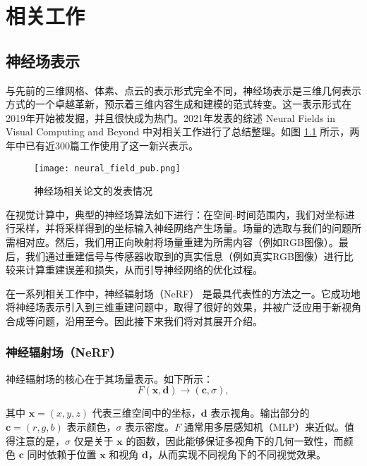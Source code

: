 \chapter{相关工作}

\section{神经场表示}

与先前的三维网格、体素、点云的表示形式完全不同，神经场表示是三维几何表示方式的一个卓越革新，预示着三维内容生成和建模的范式转变。这一表示形式在2019年开始被发掘，并且很快成为热门。2021年发表的综述 Neural Fields in Visual Computing and Beyond \cite{neural_field_summary} 中对相关工作进行了总结整理。如图 \ref{fig:neural_field_pub} 所示，两年中已有近300篇工作使用了这一新兴表示。

\begin{figure}
  \centering
  \texttt{[image: neural\_field\_pub.png]}
  \caption{神经场相关论文的发表情况}
  \label{fig:neural_field_pub}
\end{figure}

在视觉计算中，典型的神经场算法如下进行：在空间-时间范围内，我们对坐标进行采样，并将采样得到的坐标输入神经网络产生场量。场量的选取与我们的问题所需相对应。然后，我们用正向映射将场量重建为所需内容（例如RGB图像）。最后，我们通过重建信号与传感器收取到的真实信息（例如真实RGB图像）进行比较来计算重建误差和损失，从而引导神经网络的优化过程。

在一系列相关工作中，神经辐射场（NeRF）\cite{nerf} 是最具代表性的方法之一。它成功地将神经场表示引入到三维重建问题中，取得了很好的效果，并被广泛应用于新视角合成等问题，沿用至今。因此接下来我们将对其展开介绍。

\subsection{神经辐射场（NeRF）}

神经辐射场的核心在于其场量表示。如下所示：
\begin{equation}
  F(\mathbf{x},\mathbf{d})\to(\mathbf{c},\sigma),
\end{equation}

其中 $\mathbf{x}=(x,y,z)$ 代表三维空间中的坐标，$\mathbf{d}$ 表示视角。输出部分的 $\mathbf{c} = (r,g,b)$ 表示颜色，$\sigma$ 表示密度。$F$ 通常用多层感知机（MLP）来近似。值得注意的是，$\sigma$ 仅是关于 $\mathbf{x}$ 的函数，因此能够保证多视角下的几何一致性，而颜色 $\mathbf{c}$ 同时依赖于位置 $\mathbf{x}$ 和视角 $\mathbf{d}$，从而实现不同视角下的不同视觉效果。

